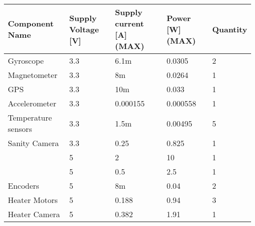 
\begin{center}
\begin{table}[H]
\begin{tabular}{|m{}|m{}|m{}|m{}|m{}|}
\hline
\textbf{Component Name} & \textbf{Supply Voltage {[}V{]}} & \textbf{Supply current {[}A{]} (MAX)} & \textbf{Power {[}W{]} (MAX)} & \textbf{Quantity} \\ \hline
Gyroscope               & 3.3                             & 6.1m                                & 0.0305                       & 2                 \\ \hline
 Magnetometer           & 3.3                           & 8m                     & 0.0264                      & 1 \\ \hline
GPS                     & 3.3                             & 10m                                 & 0.033                        & 1                 \\ \hline
Accelerometer           & 3.3                             & 0.000155                            & 0.000558                     & 1                 \\ \hline
Temperature sensors     & 3.3                             & 1.5m                                & 0.00495                      & 5                 \\ \hline
Sanity Camera           & 3.3                             & 0.25                                & 0.825                        & 1                 \\ \hline
\rowcolor{yellow}{Raspberry Pi 3 B+ }  & 5                               & 2                                   & 10                           & 1                 \\ \hline
\rowcolor{yellow}{Raspberry Pi zero}	 	& 5   					& 0.5
& 2.5						   & 1				\\ \hline
Encoders                & 5                               & 8m                                  & 0.04                         & 2                 \\ \hline
Heater Motors           & 5                               & 0.188                               & 0.94                         & 3                 \\ \hline
Heater Camera           & 5                               & 0.382                               & 1.91                         & 1                 \\ \hline

\end{tabular}
\end{table}
\end{center}
